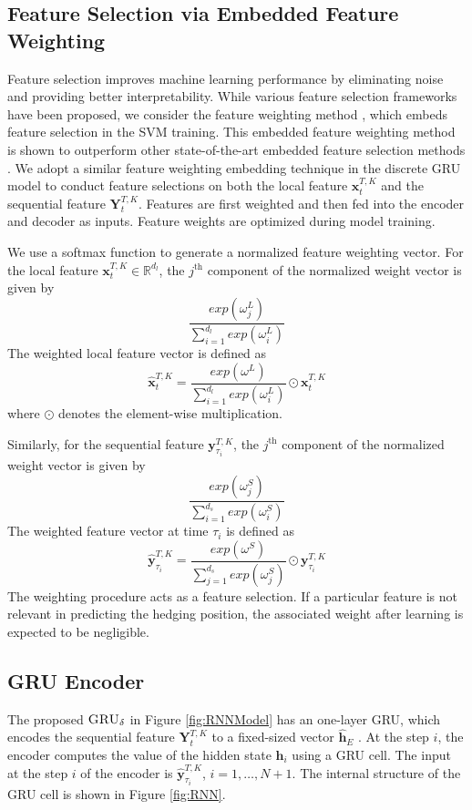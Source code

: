 \documentclass[letterpaper,12pt,titlepage,oneside,final]{book}
\numberwithin{equation}{section}
\theoremstyle{definition}
\newcommand{\model}{\textsc{GRU}_\delta}
\newcommand{\vx}{\mathbf{x}}
\newcommand{\vy}{\mathbf{y}}
\newcommand{\Real}{\mathbb{R}}
\newcommand{\vh}{\mathbf{h}}
\begin{document}
\subsection{Feature Selection via Embedded Feature Weighting}
 Feature selection improves machine learning performance by eliminating noise and providing better interpretability. While various feature selection frameworks have  been proposed,  we consider the feature weighting method \citep{tayal2014primal}, which embeds feature selection  in the SVM training.
  This  embedded feature weighting method is shown to outperform other state-of-the-art embedded feature selection methods \citep{tayal2014primal}.
We adopt a similar feature weighting embedding technique in the discrete GRU model to conduct feature selections on both the local feature $\vx^{T,K}_{t}$ and the sequential feature $\mathbf{Y}_{t}^{T,K}$.
Features are first weighted and then fed into the encoder and decoder as inputs. Feature weights are optimized during model training.

We  use a softmax function to generate a normalized  feature weighting vector. For the local feature $\vx^{T,K}_{t}  \in \Real^{d_l}$, the $j^\text{th}$ component of the normalized weight vector is given by
\[
\frac{exp(\omega^L_j)}{\sum_{i=1}^{d_l} exp(\omega^L_i)}
\]
The weighted  local feature vector is defined as
\[\widehat{\vx}^{T,K}_{t}=\frac{exp(\omega^L)}{\sum_{i=1}^{d_l} exp(\omega^L_i)}\odot \vx^{T,K}_{t} \] 
where $\odot$ denotes the element-wise multiplication.

Similarly,
for the sequential feature $\mathbf{y}_{\tau_i}^{T,K}$,  the $j^\text{th}$ component of the normalized weight vector is given by
\[
\frac{exp(\omega^S_j)}{\sum_{i=1}^{d_s} exp(\omega^S_i)}
\]
  The weighted feature vector at time  $\tau_i$ is defined as
\[
\widehat{\vy}_{\tau_i}^{T,K} =\frac{exp(\omega^S)}{\sum_{j=1}^{d_s} exp(\omega^S_j)} \odot \mathbf{y}_{\tau_i}^{T,K}
\]
{The weighting procedure acts as a feature selection.}
If a  particular feature is not relevant in predicting the hedging position, the associated weight after learning  is expected to be negligible.


\subsection{GRU Encoder}
The  proposed $\model$  in Figure \ref{fig:RNNModel} has an one-layer GRU, which encodes the sequential feature $\mathbf{Y}_{t}^{T,K}$ to  a fixed-sized vector
$\mathbf{\widehat{h}}_E$ .
At the  step $i$,  the encoder computes the value of the hidden state $\vh_{i}$ using a GRU cell. The input at the step $i$ of the encoder is $\widehat{\vy}^{T,K}_{\tau_{i}}$,  $i=1,\ldots,N+1$.
The internal structure of the GRU cell is shown in Figure \ref{fig:RNN}.
\end{document}
